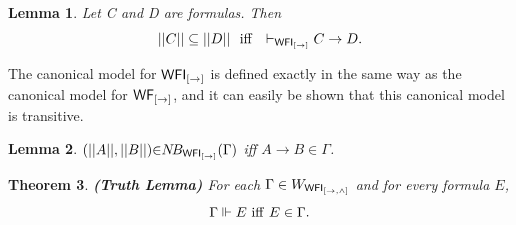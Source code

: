 \documentclass[12pt]{article}
\newtheorem{thm}{Theorem}[section]
\newtheorem{lem}[thm]{Lemma}
\newtheorem{dfn}[thm]{Definition}
\begin{document}
\begin{lem}
\label{2kk}
Let C and D are formulas. Then
$$ || C|| \subseteq  || D|| ~~{\rm iff}~~\vdash_{{\sf WFI_{[\rightarrow]}} } C\rightarrow D .$$
\end{lem}

The canonical model for ${\sf WFI_{[\rightarrow]}}$ is defined exactly in the same way as the canonical model for ${\sf WF_{[\rightarrow]}}$, and it can easily be shown that this canonical model is transitive.  


\begin{lem}
\label{xxxx22}
$( ||  A||  , ||  B ||  ) {\in} N\!B_{{\sf WFI_{[\rightarrow]}}} (\Gamma )$ iff $A\rightarrow B \in \Gamma  $.
\end{lem}

\begin{thm}
\textbf{(Truth Lemma)} 
For each $ \Gamma \in  W_{{\sf WFI_{[\rightarrow, \wedge]}}}$ and for every formula $  E $, $$ \Gamma\Vdash   E~{\rm iff}~ E \in \Gamma .$$
\end{thm}
\end{document}
